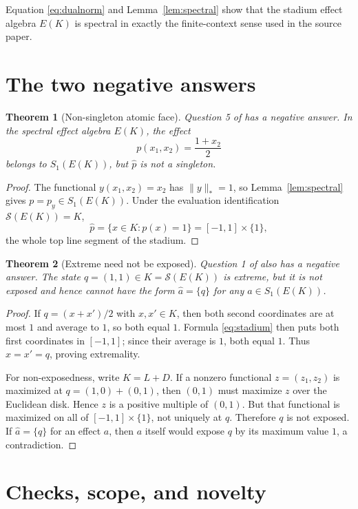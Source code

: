 \documentclass[11pt]{article}
\newtheorem{theorem}{Theorem}
\newcommand{\Sstate}{\mathcal S}
\begin{document}
Equation \eqref{eq:dualnorm} and Lemma~\ref{lem:spectral} show that the
stadium effect algebra $E(K)$ is spectral in exactly the finite-context
sense used in the source paper.

\section{The two negative answers}

\begin{theorem}[Non-singleton atomic face]\label{thm:q5}
Question 5 of \cite{JP} has a negative answer.  In the spectral effect
algebra $E(K)$, the effect
\[
 p(x_1,x_2)=\frac{1+x_2}{2}
\]
belongs to $S_1(E(K))$, but $\widehat p$ is not a singleton.
\end{theorem}

\begin{proof}
The functional $y(x_1,x_2)=x_2$ has $\|y\|_*=1$, so
Lemma~\ref{lem:spectral} gives $p=p_y\in S_1(E(K))$.  Under the
evaluation identification $\Sstate(E(K))=K$,
\[
 \widehat p=\{x\in K:p(x)=1\}
 =[-1,1]\times\{1\},
\]
the whole top line segment of the stadium.
\end{proof}

\begin{theorem}[Extreme need not be exposed]\label{thm:q1}
Question 1 of \cite{JP} also has a negative answer.  The state
$q=(1,1)\in K=\Sstate(E(K))$ is extreme, but it is not exposed and hence
cannot have the form $\widehat a=\{q\}$ for any $a\in S_1(E(K))$.
\end{theorem}

\begin{proof}
If $q=(x+x')/2$ with $x,x'\in K$, then both second coordinates are at
most $1$ and average to $1$, so both equal $1$.  Formula
\eqref{eq:stadium} then puts both first coordinates in $[-1,1]$; since
their average is $1$, both equal $1$.  Thus $x=x'=q$, proving
extremality.

For non-exposedness, write $K=L+D$.  If a nonzero functional
$z=(z_1,z_2)$ is maximized at $q=(1,0)+(0,1)$, then $(0,1)$ must maximize
$z$ over the Euclidean disk.  Hence $z$ is a positive multiple of
$(0,1)$.  But that functional is maximized on all of
$[-1,1]\times\{1\}$, not uniquely at $q$.  Therefore $q$ is not exposed.
If $\widehat a=\{q\}$ for an effect $a$, then $a$ itself would expose
$q$ by its maximum value $1$, a contradiction.
\end{proof}

\section{Checks, scope, and novelty}
\end{document}
